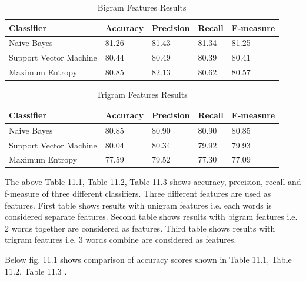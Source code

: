 \documentclass[oneside,a4paper,12pt]{pictreport}
\begin{document}
\begin{table}[h!]
\centering
\caption{Bigram Features Results}
\label{my-label}
\begin{tabular}{|l|l|l|l|l|}
\hline
\textbf{Classifier} & \textbf{Accuracy} & \textbf{Precision} & \textbf{Recall} & \textbf{F-measure}\\ \hline
Naive Bayes          & 81.26  & 81.43 & 81.34 & 81.25                   \\ \hline
Support Vector Machine          & 80.44  & 80.49 & 80.39 & 80.41                   \\ \hline
Maximum Entropy          & 80.85  & 82.13 & 80.62 & 80.57 \\ \hline
\end{tabular}
\end{table}





\begin{table}[h!]
\centering
\caption{Trigram Features Results}
\label{my-label}
\begin{tabular}{|l|l|l|l|l|}
\hline
\textbf{Classifier} & \textbf{Accuracy} & \textbf{Precision} & \textbf{Recall} & \textbf{F-measure}\\ \hline
Naive Bayes          & 80.85  & 80.90 & 80.90 & 80.85                   \\ \hline
Support Vector Machine          & 80.04  & 80.34 & 79.92 & 79.93                   \\ \hline
Maximum Entropy          & 77.59  & 79.52 & 77.30 & 77.09 \\ \hline
\end{tabular}
\end{table}

\vspace{5mm}
\par The above Table 11.1, Table 11.2, Table 11.3 shows accuracy, precision, recall and f-measure
of three different classifiers. Three different features are used as features.
First table shows results with unigram features i.e. each words is considered separate features.
Second table shows results with bigram features i.e. 2 words together are considered as features.
Third table shows results with trigram features i.e. 3 words combine are considered as features.

\vspace{5mm}
\newpage
\par Below fig. 11.1 shows comparison of accuracy scores shown in Table 11.1, Table 11.2, Table 11.3 .
\end{document}
